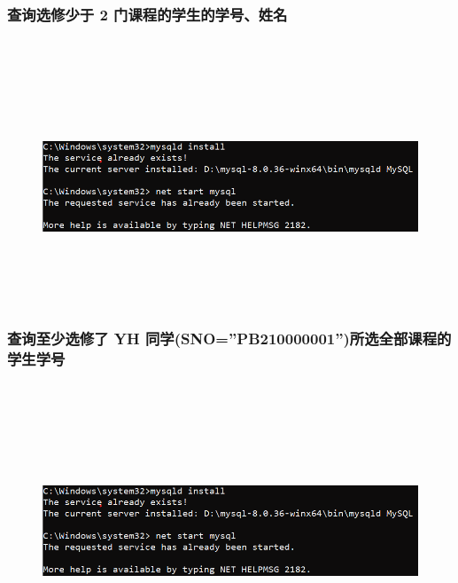 \documentclass{ctexart}
\begin{document}
\subsubsection{查询选修少于 2 门课程的学生的学号、姓名}
\begin{lstlisting}[language=sql]
	
\end{lstlisting}
\begin{figure}[H]
	\centering 
	\includegraphics[height=7cm,width=14cm]{1.png}
	\end{figure}
\subsubsection{查询至少选修了 YH 同学(SNO=”PB210000001”)所选全部课程的学生学号}
\begin{lstlisting}[language=sql]
	
\end{lstlisting}
\begin{figure}[H]
	\centering 
	\includegraphics[height=7cm,width=14cm]{1.png}
	\end{figure}
\end{document}
